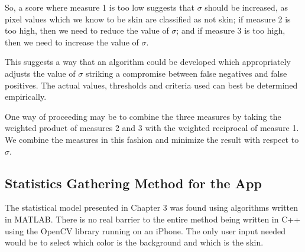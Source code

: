 So, a score where measure 1 is too low suggests that $\sigma$ should be increased, as pixel values which we know to be skin are classified as not skin; if measure 2 is too high, then we need to reduce the value of $\sigma$; and if measure 3 is too high, then we need to increase the value of $\sigma$.

This suggests a way that an algorithm could be developed which appropriately adjusts the value of $\sigma$ striking a compromise between false negatives and false positives. The actual values, thresholds and criteria used can best be determined empirically.

One way of proceeding may be to combine the three measures by taking the weighted product of measures 2 and 3 with the weighted reciprocal of measure 1. We combine the measures in this fashion and minimize the result with respect to $\sigma$.

\subsection{Statistics Gathering Method for the App}\label{sec:StatisticsGatheringMethod}
The statistical model presented in Chapter 3 was found using algorithms written in MATLAB. There is no real barrier to the entire method being written in C++ using the OpenCV library running on an iPhone. The only user input needed would be to select which color is the background and which is the skin.

